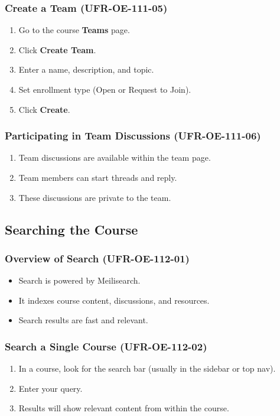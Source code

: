 \subsubsection{Create a Team (UFR-OE-111-05)}
\begin{enumerate}
    \item Go to the course \textbf{Teams} page.
    \item Click \textbf{Create Team}.
    \item Enter a name, description, and topic.
    \item Set enrollment type (Open or Request to Join).
    \item Click \textbf{Create}.
\end{enumerate}

\subsubsection{Participating in Team Discussions (UFR-OE-111-06)}
\begin{enumerate}
    \item Team discussions are available within the team page.
    \item Team members can start threads and reply.
    \item These discussions are private to the team.
\end{enumerate}

\subsection{Searching the Course}

\subsubsection{Overview of Search (UFR-OE-112-01)}
\begin{itemize}
    \item Search is powered by Meilisearch.
    \item It indexes course content, discussions, and resources.
    \item Search results are fast and relevant.
\end{itemize}

\subsubsection{Search a Single Course (UFR-OE-112-02)}
\begin{enumerate}
    \item In a course, look for the search bar (usually in the sidebar or top nav).
    \item Enter your query.
    \item Results will show relevant content from within the course.
\end{enumerate}


